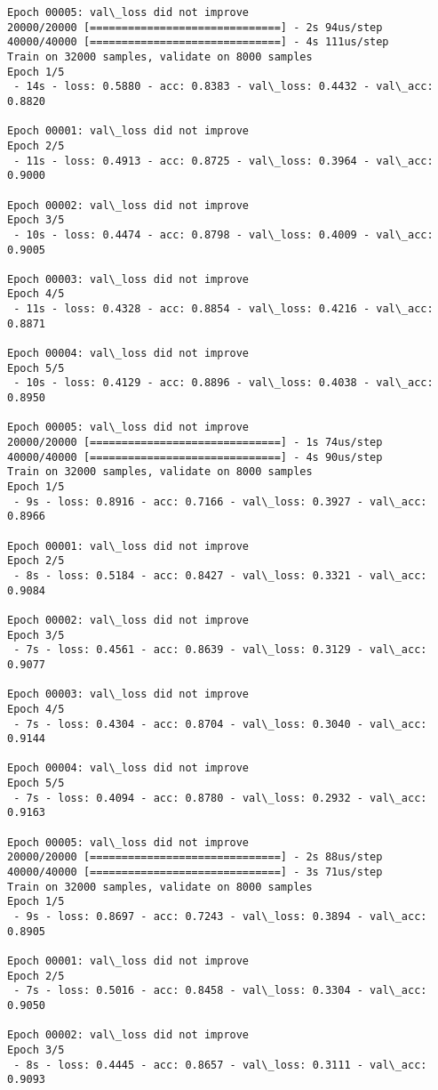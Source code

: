 \documentclass[11pt]{article}
\begin{document}
\begin{Verbatim}[commandchars=\\\{\}]
Epoch 00005: val\_loss did not improve
20000/20000 [==============================] - 2s 94us/step
40000/40000 [==============================] - 4s 111us/step
Train on 32000 samples, validate on 8000 samples
Epoch 1/5
 - 14s - loss: 0.5880 - acc: 0.8383 - val\_loss: 0.4432 - val\_acc: 0.8820

Epoch 00001: val\_loss did not improve
Epoch 2/5
 - 11s - loss: 0.4913 - acc: 0.8725 - val\_loss: 0.3964 - val\_acc: 0.9000

Epoch 00002: val\_loss did not improve
Epoch 3/5
 - 10s - loss: 0.4474 - acc: 0.8798 - val\_loss: 0.4009 - val\_acc: 0.9005

Epoch 00003: val\_loss did not improve
Epoch 4/5
 - 11s - loss: 0.4328 - acc: 0.8854 - val\_loss: 0.4216 - val\_acc: 0.8871

Epoch 00004: val\_loss did not improve
Epoch 5/5
 - 10s - loss: 0.4129 - acc: 0.8896 - val\_loss: 0.4038 - val\_acc: 0.8950

Epoch 00005: val\_loss did not improve
20000/20000 [==============================] - 1s 74us/step
40000/40000 [==============================] - 4s 90us/step
Train on 32000 samples, validate on 8000 samples
Epoch 1/5
 - 9s - loss: 0.8916 - acc: 0.7166 - val\_loss: 0.3927 - val\_acc: 0.8966

Epoch 00001: val\_loss did not improve
Epoch 2/5
 - 8s - loss: 0.5184 - acc: 0.8427 - val\_loss: 0.3321 - val\_acc: 0.9084

Epoch 00002: val\_loss did not improve
Epoch 3/5
 - 7s - loss: 0.4561 - acc: 0.8639 - val\_loss: 0.3129 - val\_acc: 0.9077

Epoch 00003: val\_loss did not improve
Epoch 4/5
 - 7s - loss: 0.4304 - acc: 0.8704 - val\_loss: 0.3040 - val\_acc: 0.9144

Epoch 00004: val\_loss did not improve
Epoch 5/5
 - 7s - loss: 0.4094 - acc: 0.8780 - val\_loss: 0.2932 - val\_acc: 0.9163

Epoch 00005: val\_loss did not improve
20000/20000 [==============================] - 2s 88us/step
40000/40000 [==============================] - 3s 71us/step
Train on 32000 samples, validate on 8000 samples
Epoch 1/5
 - 9s - loss: 0.8697 - acc: 0.7243 - val\_loss: 0.3894 - val\_acc: 0.8905

Epoch 00001: val\_loss did not improve
Epoch 2/5
 - 7s - loss: 0.5016 - acc: 0.8458 - val\_loss: 0.3304 - val\_acc: 0.9050

Epoch 00002: val\_loss did not improve
Epoch 3/5
 - 8s - loss: 0.4445 - acc: 0.8657 - val\_loss: 0.3111 - val\_acc: 0.9093


\end{Verbatim}
\end{document}
